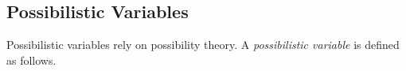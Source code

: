 







\subsection{\label{subsec:possibilistic-variables}Possibilistic Variables}
Possibilistic variables rely on possibility theory\cite{Dubois:Prade:1988:PossibilityTheory}. A \emph{possibilistic variable} is defined as follows\cite{Pon11}.

